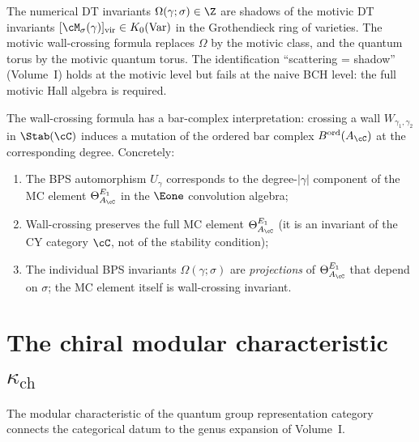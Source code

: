 \begin{remark}
\label{rem:ks-motivic}
The numerical DT invariants $\Omega(\gamma; \sigma) \in \Z$ are
shadows of the motivic DT invariants
$[\cM_\sigma(\gamma)]_{\mathrm{vir}} \in K_0(\mathrm{Var})$ in the
Grothendieck ring of varieties. The motivic wall-crossing formula
replaces $\Omega$ by the motivic class, and the quantum torus by
the motivic quantum torus. The identification ``scattering =
shadow'' (Volume~I) holds at the motivic level but fails at
the naive BCH level: the full motivic Hall algebra is required.
\end{remark}

\begin{conjecture}
\label{conj:wc-bar}
The wall-crossing formula has a bar-complex interpretation:
crossing a wall $W_{\gamma_1, \gamma_2}$ in $\Stab(\cC)$ induces
a mutation of the ordered bar complex
$B^{\mathrm{ord}}(A_\cC)$ at the corresponding degree.
Concretely:
\begin{enumerate}[label=(\roman*)]
 \item The BPS automorphism $U_\gamma$ corresponds to the
 degree-$|\gamma|$ component of the MC element
 $\Theta_{A_\cC}^{E_1}$ in the $\Eone$ convolution algebra;
 \item Wall-crossing preserves the full MC element
 $\Theta_{A_\cC}^{E_1}$ (it is an invariant of the CY category
 $\cC$, not of the stability condition);
 \item The individual BPS invariants $\Omega(\gamma; \sigma)$ are
 \emph{projections} of $\Theta_{A_\cC}^{E_1}$ that depend on
 $\sigma$; the MC element itself is wall-crossing invariant.
\end{enumerate}
\end{conjecture}


\section{The chiral modular characteristic \texorpdfstring{$\kappa_{\mathrm{ch}}$}{kappa-ch}}
\label{sec:kappa-cat}

The modular characteristic of the quantum group representation
category connects the categorical datum to the genus expansion of
Volume~I.

